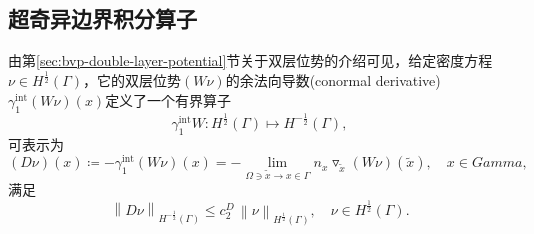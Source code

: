
\subsection{超奇异边界积分算子}
\label{sec:bvp-hyperbie-operator}

由第\ref{sec:bvp-double-layer-potential}节关于双层位势的介绍可见，给定密度方程$\nu \in H^{\frac{1}{2}}(\Gamma)$，它的双层位势$\left( W \nu \right)$的余法向导数(conormal derivative)$\gamma_{1}^{\text{int}}\left( W \nu \right)(x)$定义了一个有界算子
\begin{equation*}
  \gamma_{1}^{\text{int}} W : H^{\frac{1}{2}}(\Gamma) \mapsto H^{- \frac{1}{2}}(\Gamma),
\end{equation*}
可表示为
\begin{equation}
  \label{eq:bvp-hypersingular-bie-def}
  \left( D \nu \right)(x) \coloneqq - \gamma_{1}^{\text{int}}\left( W \nu \right)(x)
  = - \lim_{\Omega \ni \widetilde{x} \rightarrow x \in \Gamma}
  n_x \triangledown_{\widetilde{x}} \left( W \nu \right)(\widetilde{x}), \quad x \in Gamma,
\end{equation}
满足
\begin{equation}
  \label{eq:bvp-hypersingular-bie-norm}
  \left\| D \nu \right\|_{H^{-\frac{1}{2}}(\Gamma)}
  \le c_2^{D} \, \left\| \nu \right\|_{H^{\frac{1}{2}}(\Gamma)}, \quad \nu \in H^{\frac{1}{2}}(\Gamma).
\end{equation}

